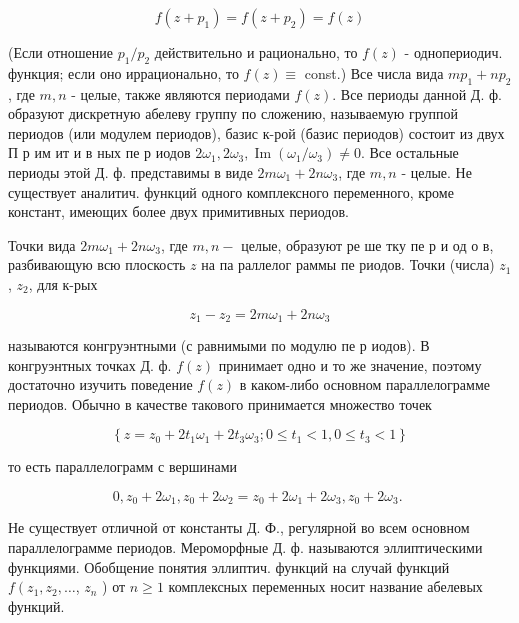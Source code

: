 \documentclass[10pt]{article}
\begin{document}
\[

f\left(z+p_{1}\right)=f\left(z+p_{2}\right)=f(z)

\]



(Если отношение $p_{1} / p_{2}$ действительно и рационально, то $f(z)$ - однопериодич. функция; если оно иррационально, то $f(z) \equiv$ const.) Все числа вида $m p_{1}+n p_{2}$, где $m, n$ - целые, также являются периодами $f(z)$. Все периоды данной Д. ф. образуют дискретную абелеву группу по сложению, называемую группой периодов (или модулем периодов), базис к-рой (базис периодов) состоит из двух П р им ит и в ных пе р иодов $2 \omega_{1}, 2 \omega_{3}, \operatorname{Im}\left(\omega_{1} / \omega_{3}\right) \neq 0$. Все остальные периоды этой Д. ф. представимы в виде $2 m \omega_{1}+2 n \omega_{3}$, где $m, n$ - целые. Не существует аналитич. функций одного комплексного переменного, кроме констант, имеющих более двух примитивных периодов.



Точки вида $2 m \omega_{1}+2 n \omega_{3}$, где $m, n-$ целые, образуют ре ше тку пе р и од о в, разбивающую всю плоскость $z$ на па раллелог раммы пе риодов. Точки (числа) $z_{1}$, $z_{2}$, для к-рых



\[

z_{1}-z_{2}=2 m \omega_{1}+2 n \omega_{3}

\]



называются конгруэнтными (с равнимыми по модулю пе р иодов). В конгруэнтных точках Д. ф. $f(z)$ принимает одно и то же значение, поэтому достаточно изучить поведение $f(z)$ в каком-либо основном параллелограмме периодов. Обычно в качестве такового принимается множество точек



\[

\left\{z=z_{0}+2 t_{1} \omega_{1}+2 t_{3} \omega_{3} ; 0 \leqslant t_{1}<1,0 \leqslant t_{3}<1\right\}

\]



то есть параллелограмм с вершинами



\[

0, z_{0}+2 \omega_{1}, z_{0}+2 \omega_{2}=z_{0}+2 \omega_{1}+2 \omega_{3}, z_{0}+2 \omega_{3} \text {. }

\]



Не существует отличной от константы Д. Ф., регулярной во всем основном параллелограмме периодов. Мероморфные Д. ф. называются эллиптическими функциями. Обобщение понятия эллиптич. функций на случай функций $f\left(z_{1}, z_{2}, \ldots\right.$, $z_{n}$ ) от $n \geqslant 1$ комплексных переменных носит название абелевых функций.
\end{document}
